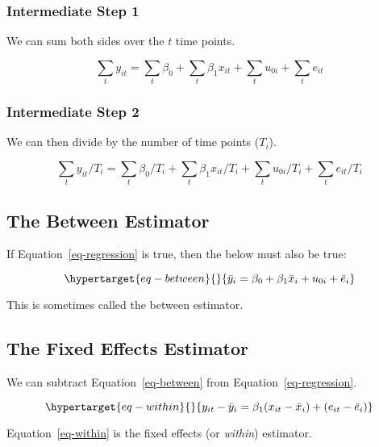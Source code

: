 \documentclass[
  letterpaper,
  DIV=11,
  numbers=noendperiod]{scrartcl}
\begin{document}
\hypertarget{intermediate-step-1}{%
\subsubsection{Intermediate Step 1}\label{intermediate-step-1}}

We can sum both sides over the \(t\) time points.

\[\sum_{t} y_{it} = \sum_{t} \beta_0 + \sum_{t} \beta_1 x_{it} + \sum_{t} u_{0i} + \sum_{t} e_{it}\]

\hypertarget{intermediate-step-2}{%
\subsubsection{Intermediate Step 2}\label{intermediate-step-2}}

We can then divide by the number of time points (\(T_i\)).

\[\sum_{t} y_{it} / T_i = \sum_{t} \beta_0 / T_i + \sum_{t} \beta_1 x_{it} / T_i + \sum_{t} u_{0i} / T_i + \sum_{t} e_{it} / T_i\]

\hypertarget{the-between-estimator}{%
\subsection{The Between Estimator}\label{the-between-estimator}}

If Equation~\ref{eq-regression} is true, then the below must also be
true:

\begin{equation}\protect\hypertarget{eq-between}{}{\bar y_i = \beta_0 + \beta_1 \bar x_i + u_{0i} + \bar e_i}\label{eq-between}\end{equation}

This is sometimes called the between estimator.

\hypertarget{the-fixed-effects-estimator}{%
\subsection{The Fixed Effects
Estimator}\label{the-fixed-effects-estimator}}

We can subtract Equation~\ref{eq-between} from
Equation~\ref{eq-regression}.

\begin{equation}\protect\hypertarget{eq-within}{}{y_{it} - \bar y_i = \beta_1 (x_{it} - \bar x_i) + (e_{it} - \bar e_i)}\label{eq-within}\end{equation}

Equation~\ref{eq-within} is the fixed effects (or \emph{within})
estimator.
\end{document}
